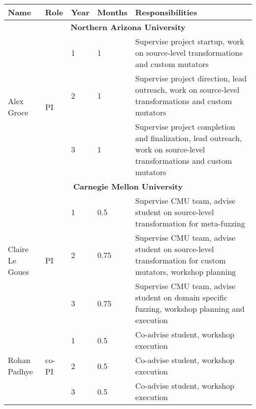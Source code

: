 \documentclass[11pt]{article}
\begin{document}
\centerline{}

\begin{tabularx}{\textwidth}{llllX}
\toprule
Name & Role & Year &  Months & Responsibilities \\\midrule
\multicolumn{5}{c}{\textbf{Northern Arizona University}} \\\midrule
\multirow{3}{*}{Alex Groce} & \multirow{3}{*}{PI} & 1  & 1 & Supervise project startup, work on source-level transformations and custom mutators \\
                            &                     & 2  & 1 & Supervise project direction, lead outreach, work on source-level transformations and custom mutators \\
                            &                     & 3  & 1 & Supervise project completion and finalization, lead outreach, work on source-level transformations and custom mutators \\\midrule
 \multicolumn{5}{c}{\textbf{Carnegie Mellon University}} \\\midrule
 \multirow{3}{*}{Claire Le Goues} & \multirow{3}{*}{PI} & 1  &  0.5 & Supervise CMU team, advise student on source-level transformation for meta-fuzzing \\
                                  &                     & 2  &  0.75 &Supervise CMU team, advise student on source-level transformation for custom mutators, workshop planning  \\
                                  &                     & 3  &  0.75 & Supervise CMU team, advise student on domain specific fuzzing, workshop planning and execution  \\
 \multirow{3}{*}{Rohan Padhye}    & \multirow{3}{*}{co-PI} & 1 & 0.5 & Co-advise student, workshop execution   \\
                                  &                     & 2  &  0.5  & Co-advise student, workshop execution  \\
                                  &                     & 3  &  0.5 &  Co-advise student, workshop execution \\\bottomrule



\end{tabularx}
\end{document}
